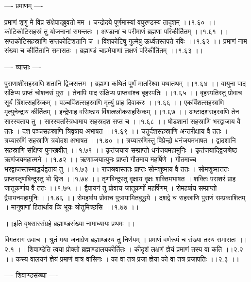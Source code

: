 \documentclass[11pt]{book}
\begin{document}
\begin{landscape}
---- प्रमाणम् ----

प्रमाणं शृणु मे विप्र संक्षेपाद्ब्रुवतो मम ।
चन्द्रोदये पूर्णमास्यां वपुरण्डस्य तादृशम् ।।१.६० ।।
कोटिकोटिसहस्रं तु योजनानां समन्ततः ।
अण्डानां च परीमाणं ब्रह्मणा परिकीर्तितम् ।।१.६१ ।।
सप्तकोटिसहस्राणि सप्तकोटिशतानि च ।
विंशकोटिषु गुल्मेषु ऊर्ध्वतस्तपते रविः ।।१.६२ ।।
प्रमाणं नाम संख्या च कीर्तितानि समासतः ।
ब्रह्माण्डं चाप्रमेयाणां लक्षणं परिकीर्तितम् ।।१.६३ ।।

---- व्यासाः ----

पुराणाशीसहस्राणि शतानि द्विजसत्तम ।
ब्रह्मणा कथितं पूर्णं मातरिश्वा यथातथम् ।।१.६४ ।।
वायुना पाद संक्षिप्य प्राप्तं चोशनसं पुरा ।
तेनापि पाद संक्षिप्य प्राप्तवांश्च बृहस्पतिः ।।१.६५ ।।
बृहस्पतिस्तु प्रोवाच सूर्यं त्रिंशत्सहस्रिकम् ।
पञ्चविंशत्सहस्राणि मृत्युं प्राह दिवाकरः ।।१.६६ ।।
एकविंशत्सहस्राणि मृत्युनेन्द्राय कीर्तितम् । 
इन्द्रेणाह वसिष्ठाय विंशत्श्लोकसहस्रिकम् ।।१.६७ ।।
अष्टादशसहस्राणि तेन सारस्वताय तु ।
सारस्वतस्त्रिधामाय सहस्रदश सप्त च ।।१.६८ ।।
षोडशानां सहस्राणि भरद्वाजाय वै ततः ।
दश पञ्चसहस्राणि त्रिवृषाय अभाषत ।।१.६९ ।।
चतुर्दशसहस्राणि अन्तरीक्षाय वै ततः ।
त्रय्यारुणिं सहस्राणि त्रयोदश अभाषत ।।१.७० ।।
त्रय्यारुणिस्तु विप्रेन्द्रो धनंजयमभाषत ।
द्वादशानि सहस्राणि संक्षिप्य पुनरब्रवीत् ।।१.७१ ।।
कृतंजयाय सम्प्राप्तो धनंजयमहामुनिः ।
कृतंजयाद्द्विजश्रेष्ठ ऋणंजयमहात्मने ।।१.७२ ।।
ऋणञ्जयात्पुनः प्राप्तो गौतमाय महर्षिणे ।
गौतमाच्च भरद्वाजस्तस्माद्धर्यद्वताय तु ।।१.७३ ।।
राजश्रवास्ततः प्राप्तः सोमशुष्माय वै ततः ।
सोमशुष्मात्ततः प्राप्तस्तृणबिन्दुस्तु भो द्विज ।।१.७४ ।।
तृणबिन्दुस्तु वृक्षाय वृक्षः शक्तिमभाषत ।
शक्तिः पराशरं प्राह जातूकर्णाय वै ततः ।।१.७५ ।।
द्वैपायनं तु प्रोवाच जातूकर्णो महर्षिणम् ।
रोमहर्षाय सम्प्राप्तो द्वैपायनमहामुनिः ।।१.७६ ।।
रोमहर्षाय प्रोवाच पुत्रायामितबुद्धये ।
दशद्वे च सहस्राणि पुराणं सम्प्रकाशितम् ।
मानुषाणां हितार्थाय किं भूयः श्रोतुमिच्छसि ।।१.७७ ।।

 ।।इति वृषसारसंग्रहे ब्रह्माण्डसंख्या नामाध्यायः प्रथमः ।।




विगतराग उवाच ।
श्रुतं मया जनाग्रेण ब्रह्माण्डस्य तु निर्णयम् ।
प्रमाणं वर्णरूपं च संख्या तस्य समासतः ।।२.१ ।।
शिवाण्डेति त्वया प्रोक्तो ब्रह्माण्डालयकीर्तितः ।
कीदृशं लक्षणं ज्ञेयं प्रमाणं तस्य वा कति ।।२.२ ।।
कस्य वालयनं ज्ञेयं प्रमाणं वात्र वासिनः ।
का वा तत्र प्रजा ज्ञेया को वा तत्र प्रजापतिः ।।२.३ ।।

---- शिवाण्डसंख्या ----


\end{landscape}
\end{document}
